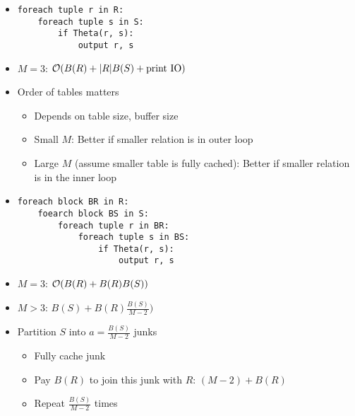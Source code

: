 \begin{itemize}
\begin{itemize}
\begin{itemize}
                    \item
\begin{verbatim}
foreach tuple r in R:
    foreach tuple s in S:
        if Theta(r, s):
            output r, s
\end{verbatim}
                    \item $M = 3$: $\mathcal{O}(B(R) + |R| B(S) + \text{print IO})$
                    \item Order of tables matters
                        \begin{itemize}
                            \item Depends on table size, buffer size
                            \item Small $M$: Better if smaller relation is in outer loop
                            \item Large $M$ (assume smaller table is fully cached): Better if smaller relation is in the inner loop
                        \end{itemize}
                \end{itemize}
                \begin{itemize}
                    \item
\begin{verbatim}
foreach block BR in R:
    foearch block BS in S:
        foreach tuple r in BR:
            foreach tuple s in BS:
                if Theta(r, s):
                    output r, s
\end{verbatim}
                    \item $M = 3$: $\mathcal{O}(B(R) + B(R) B(S))$
                    \item $M > 3$: $B(S) + B(R) \frac{B(S)}{M - 2})$
                    \item Partition $S$ into $a = \frac{B(S)}{M - 2}$ junks
                        \begin{itemize}
                            \item Fully cache junk
                            \item Pay $B(R)$ to join this junk with $R$: $(M - 2) + B(R)$
                            \item Repeat $\frac{B(S)}{M - 2}$ times 
                        \end{itemize}
                \end{itemize}
                \begin{itemize}

\end{itemize}
\end{itemize}
\end{itemize}
